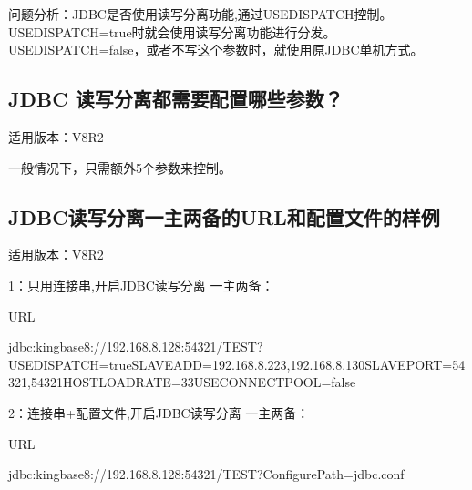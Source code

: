 \documentclass[letterpaper,10pt,english]{sphinxmanual}
\begin{document}
问题分析：JDBC是否使用读写分离功能,通过USEDISPATCH控制。USEDISPATCH=true时就会使用读写分离功能进行分发。USEDISPATCH=false，或者不写这个参数时，就使用原JDBC单机方式。


\subsection{JDBC 读写分离都需要配置哪些参数？}
\label{\detokenize{interface/jdbc:id4}}
适用版本：V8R2

一般情况下，只需额外5个参数来控制。

\begin{sphinxVerbatim}[commandchars=\\\{\}]
\end{sphinxVerbatim}


\subsection{JDBC读写分离一主两备的URL和配置文件的样例}
\label{\detokenize{interface/jdbc:id5}}
适用版本：V8R2

1：只用连接串,开启JDBC读写分离 一主两备：

URL

\begin{sphinxVerbatim}[commandchars=\\\{\}]
jdbc:kingbase8://192.168.8.128:54321/TEST?USEDISPATCH=true\PYGZam{}SLAVE\PYGZus{}ADD=192.168.8.223,192.168.8.130\PYGZam{}SLAVE\PYGZus{}PORT=54321,54321\PYGZam{}HOSTLOADRATE=33\PYGZam{}USECONNECT\PYGZus{}POOL=false
\end{sphinxVerbatim}

2：连接串+配置文件,开启JDBC读写分离 一主两备：

URL

\begin{sphinxVerbatim}[commandchars=\\\{\}]
jdbc:kingbase8://192.168.8.128:54321/TEST?ConfigurePath=jdbc.conf
\end{sphinxVerbatim}
\end{document}
